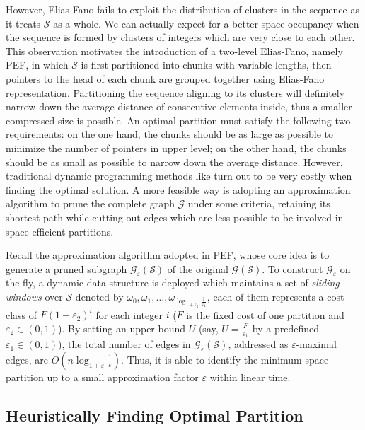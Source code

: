 \documentclass[runningheads]{comsis2}
\begin{document}
However, Elias-Fano fails to exploit the distribution of clusters in the sequence as it treats $ \mathcal{S} $ as a whole.
We can actually expect for a better space occupancy when the sequence is formed by clusters of integers which are very close to each other.
This observation motivates the introduction of a two-level Elias-Fano, namely PEF, in which $ \mathcal{S} $ is first partitioned into chunks with variable lengths, then pointers to the head of each chunk are grouped together using Elias-Fano representation.
Partitioning the sequence aligning to its clusters will definitely narrow down the average distance of consecutive elements inside, thus a smaller compressed size is possible.
An optimal partition must satisfy the following two requirements: on the one hand, the chunks should be as large as possible to minimize the number of pointers in upper level; on the other hand, the chunks should be as small as possible to narrow down the average distance.
However, traditional dynamic programming methods like \cite{silvestri2010vsencoding} turn out to be very costly when finding the optimal solution.
A more feasible way is adopting an approximation algorithm to prune the complete graph $ \mathcal{G} $ under some criteria, retaining its shortest path while cutting out edges which are less possible to be involved in space-efficient partitions.

Recall the approximation algorithm adopted in PEF, whose core idea is to generate a pruned subgraph $\mathcal{G}_{\varepsilon}\left(\mathcal{S}\right)$ of the original $\mathcal{G}\left(\mathcal{S}\right)$.
To construct $\mathcal{G}_{\varepsilon}$ on the fly, a dynamic data structure is deployed which maintains a set of \textit{sliding windows} over $\mathcal{S}$ denoted by $\omega_{0},\omega_{1},\dots, \omega_{\log_{1+\varepsilon_2}\frac{1}{\varepsilon_1}}$, each of them represents a cost class of $F\left(1+\varepsilon_2\right)^{i}$ for each integer $i$ ($F$ is the fixed cost of one partition and $\varepsilon_{2}\in\left( 0, 1 \right)$).
By setting an upper bound $U$ (say, $U=\frac{F}{\varepsilon_{1}}$ by a predefined $\varepsilon_{1}\in\left(0, 1\right)$), the total number of edges in $\mathcal{G}_{\varepsilon}\left(\mathcal{S}\right)$, addressed as $\varepsilon$-maximal edges, are $O\left(n\log_{1+\varepsilon}\frac{1}{\varepsilon}\right)$.
Thus, it is able to identify the minimum-space partition up to a small approximation factor $ \varepsilon $ within linear time.

\subsection{Heuristically Finding Optimal Partition}
\end{document}

